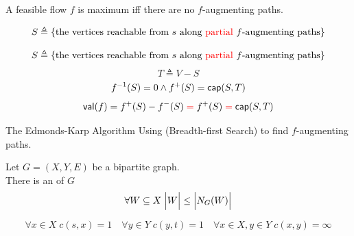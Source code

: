 \begin{frame}{}
  \begin{theorem}
    A feasible flow $f$ is maximum iff there are no $f$-augmenting paths.
  \end{theorem}

  \pause
  \vspace{0.30cm}
  \begin{center}

    \pause
    \[
      S \triangleq \{\text{the vertices reachable from $s$
      along \textcolor{red}{partial} $f$-augmenting paths}\}
    \]
  \end{center}
\end{frame}

\begin{frame}{}
  \begin{center}
    \[
      S \triangleq \{\text{the vertices reachable from $s$
      along \textcolor{red}{partial} $f$-augmenting paths}\}
    \]
    \[
      T \triangleq V - S
    \]
    \pause
    \[
      f^{-1}(S) = 0 \land f^{+}(S) = \textsf{cap}(S, T)
    \]
    \pause
    \[
      \textsf{val}(f) = f^{+}(S) - f^{-}(S) \;\textcolor{red}{=}\; f^{+}(S) \;\textcolor{red}{=}\; \textsf{cap}(S, T)
    \]
  \end{center}
\end{frame}

\begin{frame}{}
  \begin{exampleblock}{The Edmonds-Karp Algorithm}
    Using  (Breadth-first Search) to find $f$-augmenting paths.
  \end{exampleblock}

  \vspace{0.50cm}
\end{frame}

\begin{frame}{}
  \begin{theorem}
    Let $G = (X, Y, E)$ be a bipartite graph. \\[6pt]

    There is an  of $G$ 
    \[
      \forall W \subseteq X\; \Big\lvert W \Big\rvert \le \Big\lvert N_{G}(W) \Big\rvert
    \]
  \end{theorem}

  \pause
  \[
    \forall x \in X\; c(s, x) = 1 \quad \forall y \in Y\; c(y, t) = 1
    \quad \forall x \in X, y \in Y\; c(x, y) = \infty
  \]

  \pause
  \begin{center}
  \end{center}
\end{frame}

